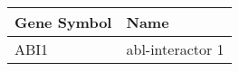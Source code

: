 \begin{tabular}{ll}
\toprule
Gene Symbol &             Name \\
\midrule
       ABI1 & abl-interactor 1 \\
\bottomrule
\end{tabular}
